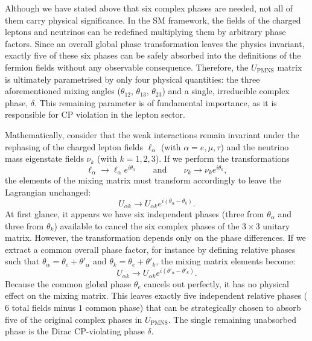 Although we have stated above that six complex phases are needed, not all of them carry physical significance. 
In the \ac{SM} framework, the fields of the charged leptons and neutrinos can be redefined multiplying them by arbitrary phase factors. 
Since an overall global phase transformation leaves the physics invariant, exactly five of these six phases can be safely absorbed into 
the definitions of the fermion fields without any observable consequence. Therefore, the $U_{\text{PMNS}}$ matrix is ultimately parametrised 
by only four physical quantities: the three aforementioned mixing angles ($\theta_{12}$, $\theta_{13}$, $\theta_{23}$) and a single, 
irreducible complex phase, $\delta$. This remaining parameter is of fundamental importance, as it is responsible for \ac{CP} violation 
in the lepton sector.

Mathematically, consider that the weak interactions remain invariant under the rephasing of the charged lepton fields
$\ell_\alpha$ (with $\alpha = e, \mu, \tau$) and the neutrino mass eigenstate fields $\nu_k$ (with $k = 1, 2, 3$). 
If we perform the transformations
\begin{equation}
    \ell_\alpha \longrightarrow \ell_\alpha e^{i\theta_\alpha} \qquad \text{and} \qquad \nu_k \longrightarrow \nu_k e^{i\theta_k},
\end{equation}
the elements of the mixing matrix must transform accordingly to leave the Lagrangian unchanged:
\begin{equation}
    U_{\alpha k} \longrightarrow U_{\alpha k} e^{i(\theta_\alpha - \theta_k)}.
\end{equation}
At first glance, it appears we have six independent phases (three from $\theta_\alpha$ and three from $\theta_k$) available to cancel 
the six complex phases of the $3 \times 3$ unitary matrix. However, the transformation depends only on the phase differences. 
If we extract a common overall phase factor, for instance by defining relative phases such that $\theta_\alpha = \theta_e + \theta'_\alpha$ 
and $\theta_k = \theta_e + \theta'_k$, the mixing matrix elements become:
\begin{equation}
    U_{\alpha k} \longrightarrow U_{\alpha k} e^{i(\theta'_\alpha - \theta'_k)}.
\end{equation}
Because the common global phase $\theta_e$ cancels out perfectly, it has no physical effect on the mixing matrix. 
This leaves exactly five independent relative phases ($6$ total fields minus $1$ common phase) that can be strategically chosen to absorb 
five of the original complex phases in $U_{\text{PMNS}}$. The single remaining unabsorbed phase is the Dirac \ac{CP}-violating phase $\delta$.

